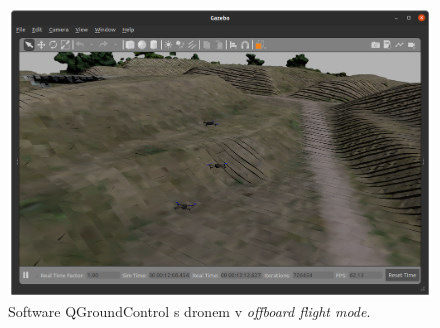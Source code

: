 \begin{figure}[!ht]
  \begin{center}
    \includegraphics[scale=0.32]{obrazky/GAZMULTIPLE.png}
  \end{center}
  \caption[Software QGroundControl s dronem v \textit{offboard flight mode}]{Software QGroundControl s dronem v \textit{offboard flight mode}.}
  \label{fig:SIM3MULGAZ}
\end{figure}
